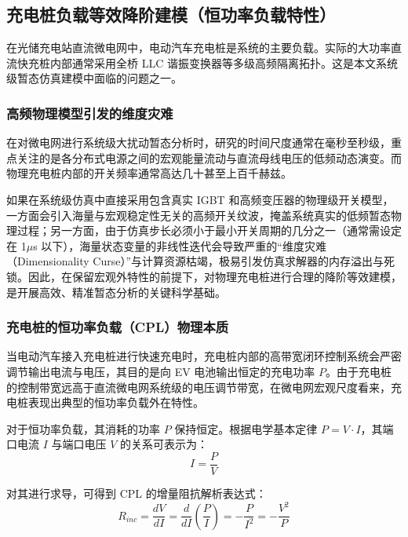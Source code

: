 \subsection{充电桩负载等效降阶建模（恒功率负载特性）}

在光储充电站直流微电网中，电动汽车充电桩是系统的主要负载。实际的大功率直流快充桩内部通常采用全桥 LLC 谐振变换器等多级高频隔离拓扑。这是本文系统级暂态仿真建模中面临的问题之一。

\subsubsection{高频物理模型引发的维度灾难}

在对微电网进行系统级大扰动暂态分析时，研究的时间尺度通常在毫秒至秒级，重点关注的是各分布式电源之间的宏观能量流动与直流母线电压的低频动态演变。而物理充电桩内部的开关频率通常高达几十甚至上百千赫兹。

如果在系统级仿真中直接采用包含真实 IGBT 和高频变压器的物理级开关模型，一方面会引入海量与宏观稳定性无关的高频开关纹波，掩盖系统真实的低频暂态物理过程；另一方面，由于仿真步长必须小于最小开关周期的几分之一（通常需设定在 1$\mu$s 以下），海量状态变量的非线性迭代会导致严重的“维度灾难（Dimensionality Curse）”与计算资源枯竭，极易引发仿真求解器的内存溢出与死锁。因此，在保留宏观外特性的前提下，对物理充电桩进行合理的降阶等效建模，是开展高效、精准暂态分析的关键科学基础。

\subsubsection{充电桩的恒功率负载（CPL）物理本质}

当电动汽车接入充电桩进行快速充电时，充电桩内部的高带宽闭环控制系统会严密调节输出电流与电压，其目的是向 EV 电池输出恒定的充电功率 $P$。由于充电桩的控制带宽远高于直流微电网系统级的电压调节带宽，在微电网宏观尺度看来，充电桩表现出典型的恒功率负载外在特性。

对于恒功率负载，其消耗的功率 $P$ 保持恒定。根据电学基本定律 $P = V \cdot I$，其端口电流 $I$ 与端口电压 $V$ 的关系可表示为：
\begin{equation}
    I = \frac{P}{V}
\end{equation}

对其进行求导，可得到 CPL 的增量阻抗解析表达式：
\begin{equation}
    R_{inc} = \frac{dV}{dI} = \frac{d}{dI} \left( \frac{P}{I} \right) = -\frac{P}{I^2} = -\frac{V^2}{P}
\end{equation}

